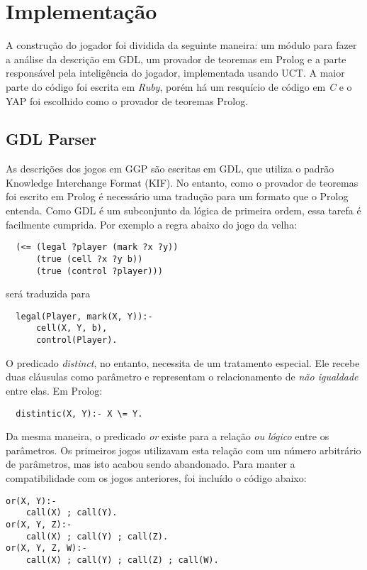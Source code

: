 \chapter{Implementação}
A construção do jogador foi dividida da seguinte maneira: um módulo para fazer a análise da descrição em GDL, um provador de teoremas em Prolog e a parte responsável pela inteligência do jogador, implementada usando UCT. A maior parte do código foi escrita em \textit{Ruby}, porém há um resquício de código em \textit{C} e o YAP foi escolhido como o provador de teoremas Prolog.

\section{GDL Parser}
As descrições dos jogos em GGP são escritas em GDL, que utiliza o padrão Knowledge Interchange Format (KIF). No entanto, como o provador de teoremas foi escrito em Prolog é necessário uma tradução para um formato que o Prolog entenda. Como GDL é um subconjunto da lógica de primeira ordem, essa tarefa é facilmente cumprida. Por exemplo a regra abaixo do jogo da velha:
\begin{verbatim}
  (<= (legal ?player (mark ?x ?y))                                                                       
      (true (cell ?x ?y b))                                                                              
      (true (control ?player)))
\end{verbatim}
será traduzida para
\begin{verbatim}
  legal(Player, mark(X, Y)):-
      cell(X, Y, b), 
      control(Player).
\end{verbatim}

O predicado \textit{distinct}, no entanto, necessita de um tratamento especial. Ele recebe duas cláusulas como parâmetro e representam o relacionamento de \textit{não igualdade} entre elas. Em Prolog:
\begin{verbatim}
  distintic(X, Y):- X \= Y. 
 \end{verbatim}

Da mesma maneira, o predicado \textit{or} existe para a relação \textit{ou lógico} entre os parâmetros. Os primeiros jogos utilizavam esta relação com um número arbitrário de parâmetros, mas isto acabou sendo abandonado. Para manter a compatibilidade com os jogos anteriores, foi incluído o código abaixo:
\begin{verbatim}
or(X, Y):- 
    call(X) ; call(Y).
or(X, Y, Z):- 
    call(X) ; call(Y) ; call(Z).
or(X, Y, Z, W):- 
    call(X) ; call(Y) ; call(Z) ; call(W).
 \end{verbatim}
 
